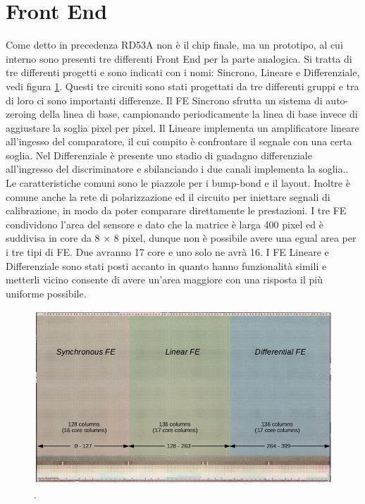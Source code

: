 \section{Front End}
Come detto in precedenza RD53A non è il chip finale, ma un prototipo, al cui interno sono presenti tre differenti Front End per la parte analogica. Si tratta di tre differenti progetti e sono indicati con i nomi: Sincrono, Lineare e Differenziale, vedi figura \ref{FrontEnd}. 
Questi tre circuiti sono stati progettati da tre differenti gruppi e tra di loro ci sono importanti differenze. Il FE Sincrono sfrutta un sistema di auto-zeroing della linea di base, campionando periodicamente la linea di base invece di aggiustare la soglia pixel per pixel. 
Il Lineare implementa un amplificatore lineare all'ingesso del comparatore, il cui compito è confrontare il segnale con una certa soglia. 
Nel Differenziale è presente uno stadio di guadagno differenziale  all'ingresso del discriminatore e sbilanciando i due canali implementa la soglia..
Le caratteristiche comuni sono le piazzole per i bump-bond e il layout. Inoltre è comune anche la rete di polarizzazione ed il circuito per iniettare segnali di calibrazione, in modo da poter comparare direttamente le prestazioni. 
I tre FE condividono l'area del sensore e dato che la matrice è larga 400 pixel ed è suddivisa in core da 8 $\times$ 8 pixel, dunque non è possibile avere una egual area per i tre tipi di FE. Due avranno 17 core e uno solo ne avrà 16. I FE Lineare e Differenziale sono stati posti accanto in quanto hanno funzionalità simili e metterli vicino consente di avere un'area maggiore con una risposta il più uniforme possibile. 
\begin{figure}
\centering
\includegraphics[scale=.3]{Immagini/FrontEnd}
\caption{.}
\label{FrontEnd}
\end{figure}

